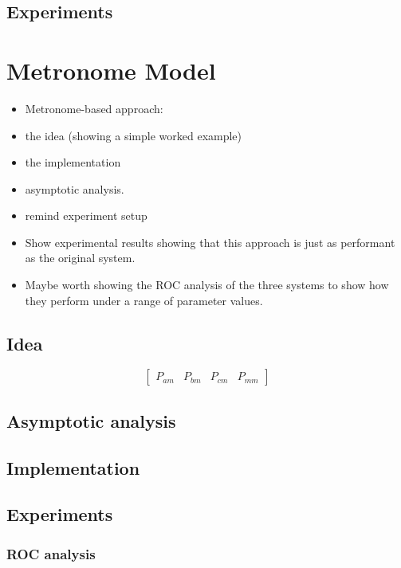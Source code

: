 \documentclass[11pt,a4paper]{article}
\begin{document}
\subsection{Experiments}

\section{Metronome Model}
\label{cha:metronome-model}

\begin{itemize}
\item Metronome-based approach:
\item the idea (showing a simple worked
  example)
\item the implementation
\item asymptotic analysis.
\item remind experiment setup
\item Show experimental results showing that this approach is just as
  performant as the original system.
\item Maybe worth showing the ROC analysis of the three systems to show
  how they perform under a range of parameter values.
\end{itemize}

\subsection{Idea}

%
%
\[
\begin{bmatrix}
  P_{am} & P_{bm} & P_{cm} & P_{mm}
\end{bmatrix}
\]

\subsection{Asymptotic analysis}
\subsection{Implementation}
\subsection{Experiments}
\subsubsection{ROC analysis}
\end{document}
